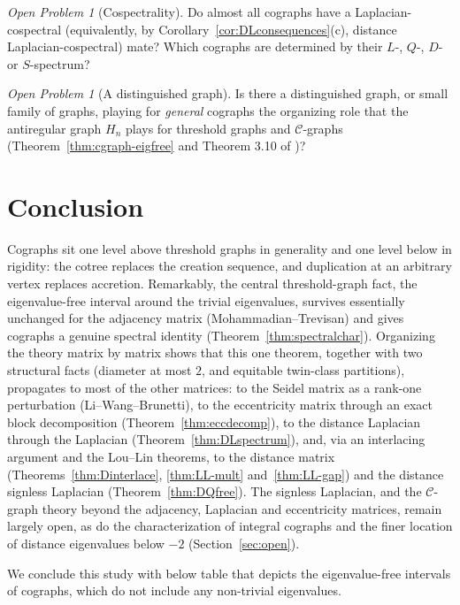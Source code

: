 \documentclass[11pt]{article}
\theoremstyle{plain}
\theoremstyle{definition}
\theoremstyle{remark}
\newtheorem{openproblem}[theorem]{Open Problem}
\begin{document}
	\begin{openproblem}[Cospectrality]
		\label{op:cospectral}
		Do almost all cographs have a Laplacian-cospectral (equivalently, by Corollary~\ref{cor:DLconsequences}(c), distance Laplacian-cospectral) mate? Which cographs are determined by their $L$-, $Q$-, $D$- or $S$-spectrum?
	\end{openproblem}
	
	\begin{openproblem}[A distinguished graph]
		Is there a distinguished graph, or small family of graphs, playing for \emph{general} cographs the organizing role that the antiregular graph $H_n$ plays for threshold graphs and $\mathcal{C}$-graphs (Theorem~\ref{thm:cgraph-eigfree} and Theorem 3.10 of \cite{MannaMandal2026})?
	\end{openproblem}
	
	\section{Conclusion}
	\label{sec:conclusion}
	
	Cographs sit one level above threshold graphs in generality and one level below in rigidity: the cotree replaces the creation sequence, and duplication at an arbitrary vertex replaces accretion. Remarkably, the central threshold-graph fact, the eigenvalue-free interval around the trivial eigenvalues, survives essentially unchanged for the adjacency matrix (Mohammadian--Trevisan) and gives cographs a genuine spectral identity (Theorem~\ref{thm:spectralchar}). Organizing the theory matrix by matrix shows that this one theorem, together with two structural facts (diameter at most $2$, and equitable twin-class partitions), propagates to most of the other matrices: to the Seidel matrix as a rank-one perturbation (Li--Wang--Brunetti), to the eccentricity matrix through an exact block decomposition (Theorem~\ref{thm:eccdecomp}), to the distance Laplacian through the Laplacian (Theorem~\ref{thm:DLspectrum}), and, via an interlacing argument and the Lou--Lin theorems, to the distance matrix (Theorems~\ref{thm:Dinterlace}, \ref{thm:LL-mult} and~\ref{thm:LL-gap}) and the distance signless Laplacian (Theorem~\ref{thm:DQfree}). The signless Laplacian, and the $\mathcal{C}$-graph theory beyond the adjacency, Laplacian and eccentricity matrices, remain largely open, as do the characterization of integral cographs and the finer location of distance eigenvalues below $-2$ (Section~\ref{sec:open}).
	
	\medskip
	We conclude this study with below table that depicts the eigenvalue-free intervals of cographs, which do not include any non-trivial eigenvalues.
	
\end{document}
